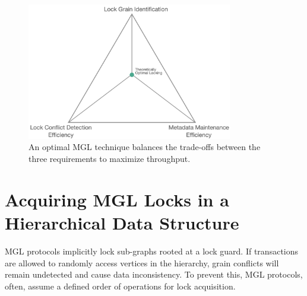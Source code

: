 \begin{figure}[h]
    \centering
    \captionsetup{justification=centering}
    \includegraphics[width=0.8\textwidth]{figures/IdealMGLTechnique.png}
    \caption{An optimal MGL technique balances the trade-offs between the three requirements to maximize throughput.}
    \label{fig:lock_throughput}
\end{figure}


\section{Acquiring MGL Locks in a Hierarchical Data Structure}
MGL protocols implicitly lock sub-graphs rooted at a lock guard. If transactions are allowed to randomly access vertices in the hierarchy, grain conflicts will remain undetected and cause data inconsistency. To prevent this, MGL protocols, often, assume a defined order of operations for lock acquisition. 

